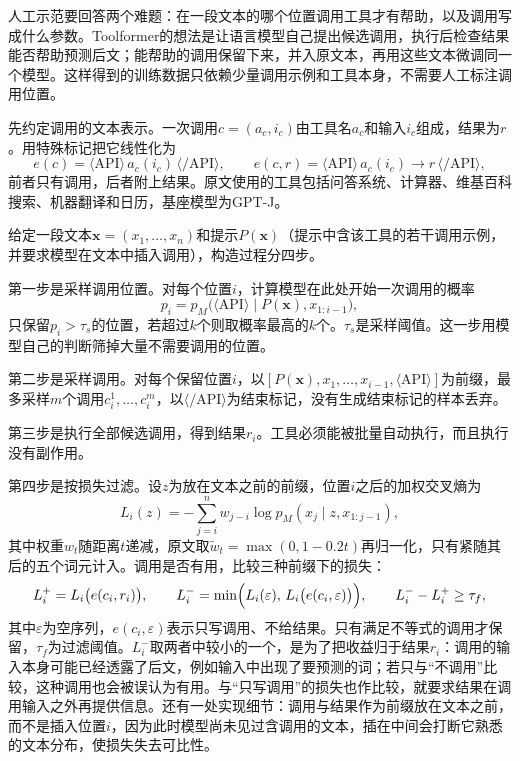 人工示范要回答两个难题：在一段文本的哪个位置调用工具才有帮助，以及调用写成什么参数。Toolformer的想法是让语言模型自己提出候选调用，执行后检查结果能否帮助预测后文；能帮助的调用保留下来，并入原文本，再用这些文本微调同一个模型。这样得到的训练数据只依赖少量调用示例和工具本身，不需要人工标注调用位置。

先约定调用的文本表示。一次调用$c=(a_c,i_c)$由工具名$a_c$和输入$i_c$组成，结果为$r$。用特殊标记把它线性化为
\[
 e(c)=\langle\mathrm{API}\rangle\,a_c(i_c)\,\langle/\mathrm{API}\rangle,\qquad
 e(c,r)=\langle\mathrm{API}\rangle\,a_c(i_c)\to r\,\langle/\mathrm{API}\rangle,
\]
前者只有调用，后者附上结果。原文使用的工具包括问答系统、计算器、维基百科搜索、机器翻译和日历，基座模型为GPT-J。

给定一段文本$\bm{x}=(x_1,\ldots,x_n)$和提示$P(\bm{x})$（提示中含该工具的若干调用示例，并要求模型在文本中插入调用），构造过程分四步。

第一步是采样调用位置。对每个位置$i$，计算模型在此处开始一次调用的概率
\[
 p_i=p_M\bigl(\langle\mathrm{API}\rangle\mid P(\bm{x}),x_{1:i-1}\bigr),
\]
只保留$p_i>\tau_s$的位置，若超过$k$个则取概率最高的$k$个。$\tau_s$是采样阈值。这一步用模型自己的判断筛掉大量不需要调用的位置。

第二步是采样调用。对每个保留位置$i$，以$[P(\bm{x}),x_1,\ldots,x_{i-1},\langle\mathrm{API}\rangle]$为前缀，最多采样$m$个调用$c_i^1,\ldots,c_i^m$，以$\langle/\mathrm{API}\rangle$为结束标记，没有生成结束标记的样本丢弃。

第三步是执行全部候选调用，得到结果$r_i$。工具必须能被批量自动执行，而且执行没有副作用。

第四步是按损失过滤。设$z$为放在文本之前的前缀，位置$i$之后的加权交叉熵为
\begin{equation}
 L_i(z)=-\sum_{j=i}^{n}w_{j-i}\log p_M(x_j\mid z,x_{1:j-1}),
 \label{eq:nlp-execution-toolformer-loss}
\end{equation}
其中权重$w_t$随距离$t$递减，原文取$\tilde w_t=\max(0,1-0.2t)$再归一化，只有紧随其后的五个词元计入。调用是否有用，比较三种前缀下的损失：
\begin{equation}
 L_i^+=L_i\bigl(e(c_i,r_i)\bigr),\qquad
 L_i^-=\min\Bigl(L_i(\varepsilon),\,L_i\bigl(e(c_i,\varepsilon)\bigr)\Bigr),\qquad
 L_i^--L_i^+\geq\tau_f ,
 \label{eq:nlp-execution-toolformer-filter}
\end{equation}
其中$\varepsilon$为空序列，$e(c_i,\varepsilon)$表示只写调用、不给结果。只有满足不等式的调用才保留，$\tau_f$为过滤阈值。$L_i^-$取两者中较小的一个，是为了把收益归于结果$r_i$：调用的输入本身可能已经透露了后文，例如输入中出现了要预测的词；若只与“不调用”比较，这种调用也会被误认为有用。与“只写调用”的损失也作比较，就要求结果在调用输入之外再提供信息。还有一处实现细节：调用与结果作为前缀放在文本之前，而不是插入位置$i$，因为此时模型尚未见过含调用的文本，插在中间会打断它熟悉的文本分布，使损失失去可比性。

